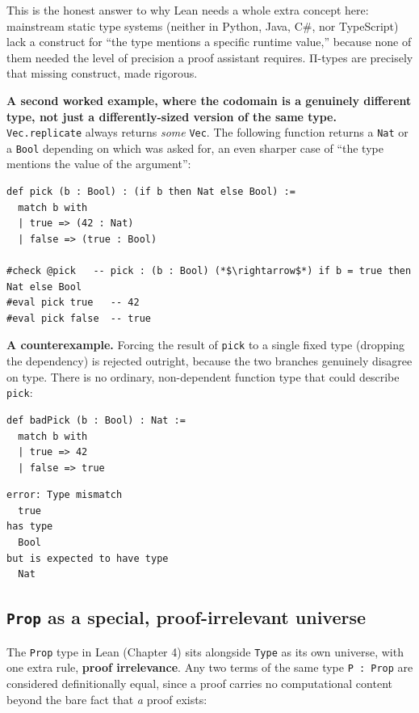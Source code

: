 This is the honest answer to why Lean needs a whole extra concept here: mainstream static type systems (neither in Python, Java, C\#, nor TypeScript) lack a construct for ``the type mentions a specific runtime value,'' because none of them needed the level of precision a proof assistant requires. Π-types are precisely that missing construct, made rigorous.

\textbf{A second worked example, where the codomain is a genuinely different type, not just a differently-sized version of the same type.} \texttt{Vec.replicate} always returns \emph{some} \texttt{Vec}. The following function returns a \texttt{Nat} or a \texttt{Bool} depending on which was asked for, an even sharper case of ``the type mentions the value of the argument'':

\begin{lstlisting}
def pick (b : Bool) : (if b then Nat else Bool) :=
  match b with
  | true => (42 : Nat)
  | false => (true : Bool)

#check @pick   -- pick : (b : Bool) (*$\rightarrow$*) if b = true then Nat else Bool
#eval pick true   -- 42
#eval pick false  -- true
\end{lstlisting}

\textbf{A counterexample.} Forcing the result of \texttt{pick} to a single fixed type (dropping the dependency) is rejected outright, because the two branches genuinely disagree on type. There is no ordinary, non-dependent function type that could describe \texttt{pick}:

\begin{lstlisting}
def badPick (b : Bool) : Nat :=
  match b with
  | true => 42
  | false => true
\end{lstlisting}

\begin{lstlisting}
error: Type mismatch
  true
has type
  Bool
but is expected to have type
  Nat
\end{lstlisting}

\subsection{\texorpdfstring{\texttt{Prop} as a special, proof-irrelevant universe}{Prop as a special, proof-irrelevant universe}}\label{sec:02-terminology-and-coc:02-pi-sigma-and-coc:3}

The \texttt{Prop} type in Lean (Chapter 4) sits alongside \texttt{Type} as its own universe, with one extra rule, \textbf{proof irrelevance}. Any two terms of the same type \texttt{P : Prop} are considered definitionally equal, since a proof carries no computational content beyond the bare fact that \emph{a} proof exists:

